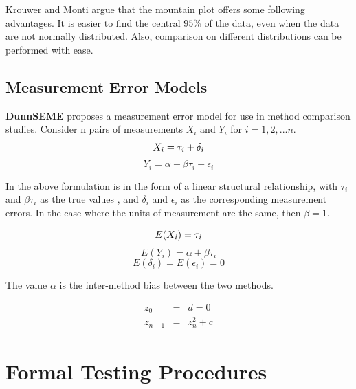 \documentclass[12pt, a4paper]{report}
\theoremstyle{plain}
\theoremstyle{definition}
\theoremstyle{remark}
\begin{document}
	Krouwer and Monti argue that the mountain plot offers some following advantages. It is easier to find the central $95\%$ of the data, even when the data are not normally distributed. Also, comparison on different distributions can be performed with ease.
	
	
	


	\section{Measurement Error Models}
	\textbf{DunnSEME} proposes a measurement error model for use in
	method comparison studies. Consider n pairs of measurements
	$X_{i}$ and $Y_{i}$ for $i=1,2,...n$.
	\begin{equation}
		X_{i} = \tau_{i}+\delta_{i}\\
	\end{equation}
	\begin{equation}
		Y_{i} = \alpha +\beta\tau_{i}+\epsilon_{i} \nonumber
	\end{equation}
	
	In the above formulation is in the form of a linear structural
	relationship, with $\tau_{i}$ and $\beta\tau_{i}$ as the true
	values , and $\delta_{i}$ and $\epsilon_{i}$ as the corresponding
	measurement errors. In the case where the units of measurement are
	the same, then $\beta =1$.
	
	\begin{equation}
		E(X_{i}) = \tau_{i}\\
	\end{equation}
	\begin{equation}
		E(Y_{i}) = \alpha +\beta\tau_{i} \nonumber
	\end{equation}
	\begin{equation}
		E(\delta_{i}) = E(\epsilon_{i}) = 0 \nonumber
	\end{equation}
	
	The value $\alpha$ is the inter-method bias between the two
	methods.
	
	\begin{eqnarray}
		z_0 &=& d = 0 \\
		z_{n+1} &=& z_n^2+c
	\end{eqnarray}
	

	\chapter{Formal Testing Procedures}
\end{document}
